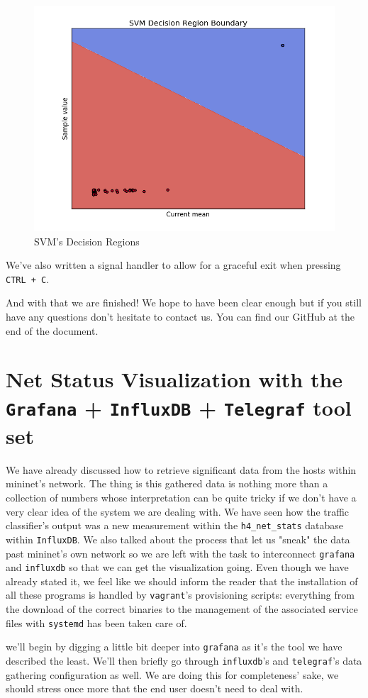 \documentclass[12pt]{article}
\newcommand{\newpar} {
    \vskip 1cm
}
\begin{document}
			\begin{figure}
				\centering
				\includegraphics[width=\linewidth]{svm_graph.png}
				\caption{SVM's Decision Regions}
				\label{f:svm_graph}
			\end{figure}

			We've also written a signal handler to allow for a graceful exit when pressing \texttt{CTRL + C}.
			\newpar
			And with that we are finished! We hope to have been clear enough but if you still have any questions don't hesitate to contact us. You can find our GitHub at the end of the document.

\newpage

\section{Net Status Visualization with the \texttt{Grafana} + \texttt{InfluxDB} + \texttt{Telegraf} tool set}
	We have already discussed how to retrieve significant data from the hosts within mininet's network. The thing is this gathered data is nothing more than a collection of numbers whose interpretation can be quite tricky if we don't have a very clear idea of the system we are dealing with. We have seen how the traffic classifier's output was a new measurement within the \texttt{h4_net_stats} database within \texttt{InfluxDB}. We also talked about the process that let us "sneak" the data past mininet's own network so we are left with the task to interconnect \texttt{grafana} and \texttt{influxdb} so that we can get the visualization going. Even though we have already stated it, we feel like we should inform the reader that the installation of all these programs is handled by \texttt{vagrant}'s provisioning scripts: everything from the download of the correct binaries to the management of the associated service files with \texttt{systemd} has been taken care of.
	\newpar
	we'll begin by digging a little bit deeper into \texttt{grafana} as it's the tool we have described the least. We'll then briefly go through \texttt{influxdb}'s and \texttt{telegraf}'s data gathering configuration as well. We are doing this for completeness' sake, we should stress once more that the end user doesn't need to deal with.
\end{document}
